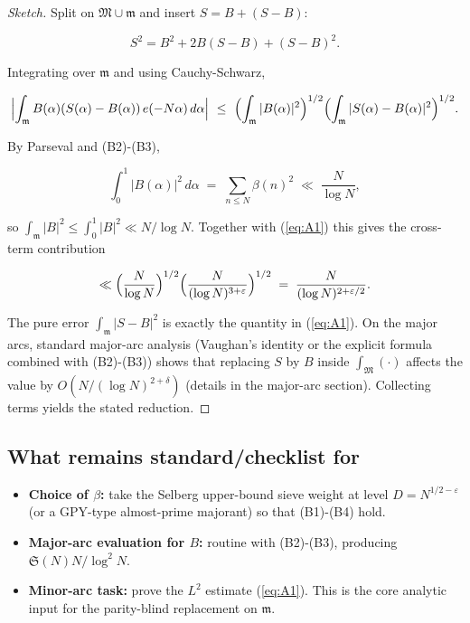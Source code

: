 \documentclass[11pt]{article}
\def\eqref#1{(\ref{#1})}%
\theoremstyle{definition}
\theoremstyle{remark}
\numberwithin{equation}{part}
\begin{document}
\begin{proof}[Sketch]
	Split on $\mathfrak M\cup\mathfrak m$ and insert $S=B+(S-B)$:

	$$
		S^2 = B^2 + 2B(S-B) + (S-B)^2.
	$$

	Integrating over $\mathfrak m$ and using Cauchy-Schwarz,

	$$
		\Bigl|\int_{\mathfrak m} B(\alpha)(S(\alpha)-B(\alpha))\,e(-N\alpha)\,d\alpha\Bigr|
		\ \le\ \Bigl(\int_{\mathfrak m}|B(\alpha)|^2\Bigr)^{1/2}
		\Bigl(\int_{\mathfrak m}|S(\alpha)-B(\alpha)|^2\Bigr)^{1/2}.
	$$

	By Parseval and (B2)-(B3),

	$$
		\int_0^1 |B(\alpha)|^2\,d\alpha \;=\; \sum_{n\le N}\beta(n)^2 \;\ll\; \frac{N}{\log N},
	$$

	so $\int_{\mathfrak m}|B|^2\le\int_0^1|B|^2\ll N/\log N$. Together with \eqref{eq:A1} this gives the cross-term contribution

	$$
		\ll \Bigl(\frac{N}{\log N}\Bigr)^{1/2}\Bigl(\frac{N}{(\log N)^{3+\varepsilon}}\Bigr)^{1/2}
		\;=\;\frac{N}{(\log N)^{2+\varepsilon/2}}.
	$$

	The pure error $\int_{\mathfrak m}|S-B|^2$ is exactly the quantity in \eqref{eq:A1}. On the major arcs, standard major-arc analysis (Vaughan’s identity or the explicit formula combined with (B2)-(B3)) shows that replacing $S$ by $B$ inside $\int_{\mathfrak M}(\cdot)$ affects the value by $O(N/(\log N)^{2+\delta})$ (details in the major-arc section). Collecting terms yields the stated reduction.
\end{proof}

\subsection{What remains standard/checklist for \textbeta}

\begin{itemize}
	\item \textbf{Choice of $\beta$:} take the Selberg upper-bound sieve weight at level $D=N^{1/2-\varepsilon}$ (or a GPY-type almost-prime majorant) so that (B1)-(B4) hold.
	\item \textbf{Major-arc evaluation for $B$:} routine with (B2)-(B3), producing $\mathfrak S(N)N/\log^2 N$.
	\item \textbf{Minor-arc task:} prove the $L^2$ estimate \eqref{eq:A1}. This is the core analytic input for the parity-blind replacement on $\mathfrak m$.
\end{itemize}
\end{document}
